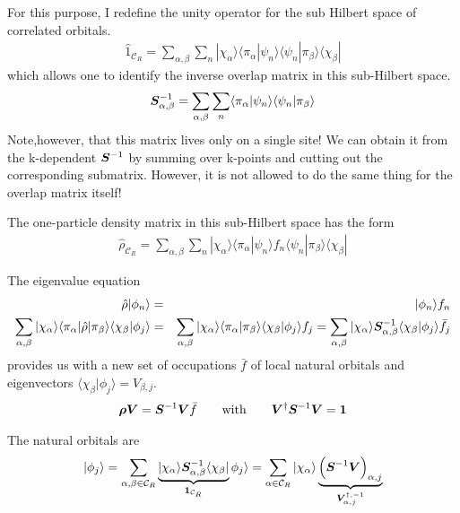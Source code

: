 \documentclass[11pt,a4paper]{report}
\begin{document}
For this purpose, I redefine the unity operator for the sub Hilbert
space of correlated orbitals.
\begin{eqnarray}
\hat{1}_{\mathcal{C}_R}
=\sum_{\alpha,\beta}\sum_n
|\chi_\alpha\rangle
\langle\pi_\alpha|\psi_n\rangle\langle\psi_n|\pi_\beta\rangle
\langle\chi_\beta|
\end{eqnarray}
which allows one to identify the inverse overlap matrix in this
sub-Hilbert space.
\begin{eqnarray}
\bm{S}^{-1}_{\alpha,\beta}
=\sum_{\alpha,\beta}\sum_n
\langle\pi_\alpha|\psi_n\rangle\langle\psi_n|\pi_\beta\rangle
\end{eqnarray}
Note,however, that this matrix lives only on a single site! We can
obtain it from the k-dependent $\bm{S}^{-1}$ by summing over k-points
and cutting out the corresponding submatrix. However, it is not
allowed to do the same thing for the overlap matrix itself!

The one-particle density matrix in this sub-Hilbert space has the form
\begin{eqnarray}
\hat{\rho}_{\mathcal{C}_R}
=\sum_{\alpha,\beta}\sum_n
|\chi_\alpha\rangle
\langle\pi_\alpha|\psi_n\rangle f_n \langle\psi_n|\pi_\beta\rangle
\langle\chi_\beta|
\end{eqnarray}

The eigenvalue equation
\begin{eqnarray}
\hat{\rho}|\phi_n\rangle&=&|\phi_n\rangle f_n
\nonumber\\
\sum_{\alpha,\beta}|\chi_\alpha\rangle
\langle\pi_\alpha|\hat{\rho}|\pi_\beta\rangle\langle\chi_\beta|\phi_j\rangle
&=&\sum_{\alpha,\beta}|\chi_\alpha\rangle\langle\pi_\alpha|\pi_\beta\rangle
\langle\chi_\beta|\phi_j\rangle f_j
=\sum_{\alpha,\beta}|\chi_\alpha\rangle
\bm{S}^{-1}_{\alpha,\beta}\langle\chi_\beta|\phi_j\rangle \bar{f}_j
\end{eqnarray}
provides us with a new set of occupations $\bar{f}$ of local natural
orbitals and eigenvectors
$\langle\chi_\beta|\phi_j\rangle=V_{\beta,j}$.
\begin{eqnarray}
\bm{\rho}\bm{V}=\bm{S}^{-1}\bm{V}\bar{f}
\qquad\text{with}\qquad
\bm{V}^\dagger\bm{S}^{-1}\bm{V}=\bm{1}
\label{eq:eigenvaluprobforlocalnatorb}
\end{eqnarray}

The natural orbitals are
\begin{eqnarray}
|\phi_j\rangle=\sum_{\alpha,\beta\in\mathcal{C}_R}
\underbrace{|\chi_\alpha\rangle
\bm{S}^{-1}_{\alpha,\beta}\langle\chi_\beta|}_{\bm{1}_{\mathcal{C}_R}}
\phi_j\rangle
=\sum_{\alpha\in\mathcal{C}_R}|\chi_\alpha\rangle
\underbrace{\Bigl(\bm{S}^{-1}\bm{V}\Bigr)_{\alpha,j}}_{\bm{V}^{\dagger,-1}_{\alpha,j}}
\end{eqnarray}
\end{document}
